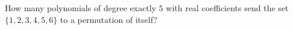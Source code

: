 How many polynomials of degree exactly $5$ with real coefficients send the set $\{1, 2, 3, 4, 5, 6\}$ to a permutation of itself?